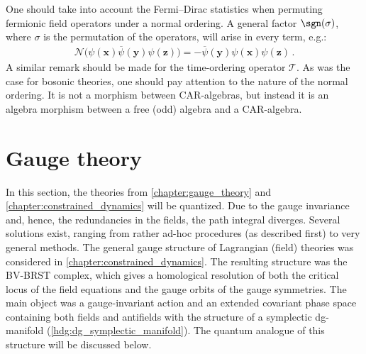 
    \begin{remark}\label{qft:ordering_morphism}
        One should take into account the Fermi--Dirac statistics when permuting fermionic field operators under a normal ordering. A general factor $\sgn(\sigma)$, where $\sigma$ is the permutation of the operators, will arise in every term, e.g.:
        \begin{gather}
            \mathcal{N}\bigl(\psi(\symbf{x})\overline\psi(\symbf{y})\psi(\symbf{z})\bigr) = -\overline\psi(\symbf{y})\psi(\symbf{x})\psi(\symbf{z})\,.
        \end{gather}
        A similar remark should be made for the time-ordering operator $\mathcal{T}$. As was the case for bosonic theories, one should pay attention to the nature of the normal ordering. It is not a morphism between CAR-algebras, but instead it is an algebra morphism between a free (odd) algebra and a CAR-algebra.
    \end{remark}

\section{Gauge theory}

    In this section, the theories from \cref{chapter:gauge_theory} and \cref{chapter:constrained_dynamics} will be quantized. Due to the gauge invariance and, hence, the redundancies in the fields, the path integral diverges. Several solutions exist, ranging from rather ad-hoc procedures (as described first) to very general methods. The general gauge structure of Lagrangian (field) theories was considered in \cref{chapter:constrained_dynamics}. The resulting structure was the BV-BRST complex, which gives a homological resolution of both the critical locus of the field equations and the gauge orbits of the gauge symmetries. The main object was a gauge-invariant action and an extended covariant phase space containing both fields and antifields with the structure of a symplectic dg-manifold (\cref{hdg:dg_symplectic_manifold}). The quantum analogue of this structure will be discussed below.

